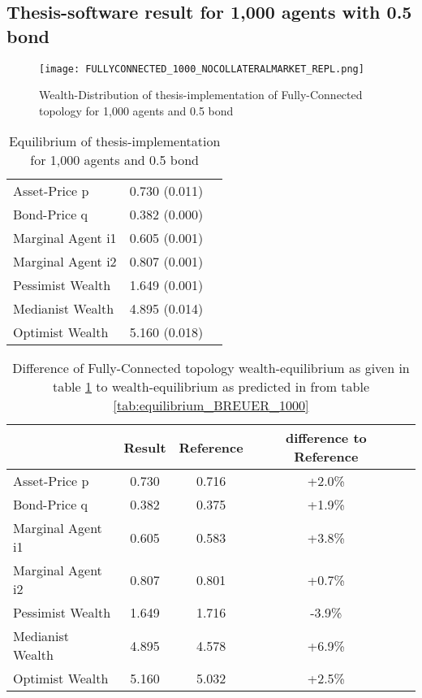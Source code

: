 \documentclass[Bachelorarbeit.tex]{subfiles}
\begin{document}
\subsection{Thesis-software result for 1,000 agents with 0.5 bond}
\begin{figure}[H]
	\centering
  \texttt{[image: FULLYCONNECTED\_1000\_NOCOLLATERALMARKET\_REPL.png]}
	\caption{Wealth-Distribution of thesis-implementation of Fully-Connected topology for 1,000 agents and 0.5 bond}
	\label{fig:wealth_FULLYCONNECTED_1000_NOCOLLATERALMARKET_REPL}
\end{figure}

\begin{table}[H]
	\centering
	\caption{Equilibrium of thesis-implementation for 1,000 agents and 0.5 bond}
	\begin{tabular} { l c r }
		\hline
		Asset-Price p & 0.730 (0.011) \\
		Bond-Price q & 0.382 (0.000) \\
		Marginal Agent i1 & 0.605 (0.001) \\
		Marginal Agent i2 & 0.807 (0.001) \\
		\hline
		Pessimist Wealth & 1.649 (0.001) \\
		Medianist Wealth & 4.895 (0.014) \\
		Optimist Wealth & 5.160 (0.018) \\
		\hline
	\end{tabular}
	\label{tab:equilibrium_THESIS_1000_50_REPL}
\end{table}

\begin{table}[H]
	\caption{Difference of Fully-Connected topology wealth-equilibrium as given in table \ref{tab:equilibrium_THESIS_1000_50_REPL} to wealth-equilibrium as predicted in \cite{Breuer2015} from table \ref{tab:equilibrium_BREUER_1000}}
	\centering
	\begin{tabular} { l c c c r }
		& Result & Reference & difference to Reference \\
		\hline
		Asset-Price p & 0.730 & 0.716 & +2.0\% \\
		Bond-Price q & 0.382 & 0.375 & +1.9\% \\
		Marginal Agent i1 & 0.605  & 0.583 & +3.8\% \\
		Marginal Agent i2 & 0.807 & 0.801 & +0.7\% \\
		\hline
		Pessimist Wealth  & 1.649 & 1.716 & -3.9\% \\
		Medianist Wealth & 4.895 & 4.578 & +6.9\% \\
		Optimist Wealth & 5.160 & 5.032 & +2.5\% \\
		\hline
	\end{tabular}
\end{table} 
\end{document}
